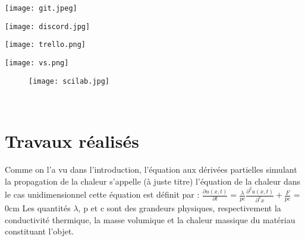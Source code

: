 \documentclass[french]{report}
\begin{document}
\begin{minipage}[c]{.46\linewidth}
     \begin{center}
           
             \texttt{[image: git.jpeg]}
            
         \end{center}
   \end{minipage} \hfill
   \begin{minipage}[c]{.46\linewidth}
    \begin{center}
            \texttt{[image: discord.jpg]}
        \end{center}
 \end{minipage}
 \bigbreak
 
 \begin{minipage}[c]{.46\linewidth}
     \begin{center}
           
             \texttt{[image: trello.png]}
            
         \end{center}
   \end{minipage} \hfill
   \begin{minipage}[c]{.46\linewidth}
    \begin{center}
            \texttt{[image: vs.png]}
        \end{center}
 \end{minipage}
 
 \begin{figure}[htbp] 
   \begin{center} 
      \texttt{[image: scilab.jpg]} 
   \end{center} 
  
\end{figure} \\




\chapter{Travaux réalisés }
Comme on l'a vu dans l'introduction, l’équation aux dérivées partielles simulant la propagation de la
chaleur s’appelle (à juste titre) l’équation de la chaleur dans le cas unidimensionnel cette équation est définit par :\bigbreak
    $ \frac{\partial u(x,t)}{\partial t} =\frac{\lambda}{pc} \frac{\partial^2 u(x,t)}{\partial^2 x} + \frac{F}{pc}$
    \leftskip=3cm
\bigbreak
\leftskip = 0cm
Les quantités $\lambda$, p et c sont des grandeurs physiques, respectivement la conductivité thermique, la
masse volumique et la chaleur massique du matériau constituant l’objet.\\\\
\end{document}
